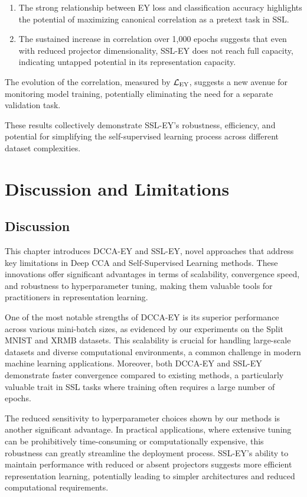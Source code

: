 \begin{enumerate}
    \item The strong relationship between EY loss and classification accuracy highlights the potential of maximizing canonical correlation as a pretext task in SSL.
    \item The sustained increase in correlation over 1,000 epochs suggests that even with reduced projector dimensionality, SSL-EY does not reach full capacity, indicating untapped potential in its representation capacity.
\end{enumerate}

The evolution of the correlation, measured by $\mathcal{L}_\text{EY}$, suggests a new avenue for monitoring model training, potentially eliminating the need for a separate validation task.

These results collectively demonstrate SSL-EY's robustness, efficiency, and potential for simplifying the self-supervised learning process across different dataset complexities.


\section{Discussion and Limitations}

\subsection{Discussion}

This chapter introduces DCCA-EY and SSL-EY, novel approaches that address key limitations in Deep CCA and Self-Supervised Learning methods. These innovations offer significant advantages in terms of scalability, convergence speed, and robustness to hyperparameter tuning, making them valuable tools for practitioners in representation learning.

One of the most notable strengths of DCCA-EY is its superior performance across various mini-batch sizes, as evidenced by our experiments on the Split MNIST and XRMB datasets. This scalability is crucial for handling large-scale datasets and diverse computational environments, a common challenge in modern machine learning applications. Moreover, both DCCA-EY and SSL-EY demonstrate faster convergence compared to existing methods, a particularly valuable trait in SSL tasks where training often requires a large number of epochs.

The reduced sensitivity to hyperparameter choices shown by our methods is another significant advantage. In practical applications, where extensive tuning can be prohibitively time-consuming or computationally expensive, this robustness can greatly streamline the deployment process. SSL-EY's ability to maintain performance with reduced or absent projectors suggests more efficient representation learning, potentially leading to simpler architectures and reduced computational requirements.

